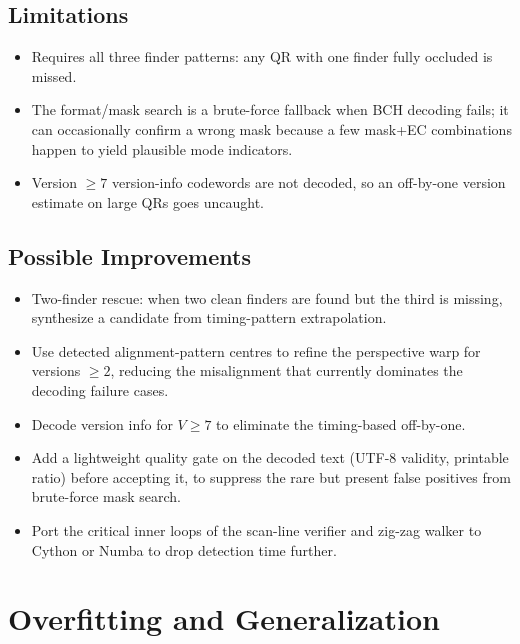 \documentclass[11pt,a4paper]{article}
\begin{document}
\subsection{Limitations}

\begin{itemize}[leftmargin=1.4em, itemsep=0.2em]
  \item Requires all three finder patterns: any QR with one finder
        fully occluded is missed.
  \item The format/mask search is a brute-force fallback when BCH
        decoding fails; it can occasionally confirm a wrong mask
        because a few mask+EC combinations happen to yield plausible
        mode indicators.
  \item Version $\ge 7$ version-info codewords are not decoded, so an
        off-by-one version estimate on large QRs goes uncaught.
\end{itemize}

\subsection{Possible Improvements}

\begin{itemize}[leftmargin=1.4em, itemsep=0.2em]
  \item Two-finder rescue: when two clean finders are found but the
        third is missing, synthesize a candidate from timing-pattern
        extrapolation.
  \item Use detected alignment-pattern centres to refine the
        perspective warp for versions $\ge 2$, reducing the
        misalignment that currently dominates the decoding failure
        cases.
  \item Decode version info for $V \ge 7$ to eliminate the
        timing-based off-by-one.
  \item Add a lightweight quality gate on the decoded text (UTF-8
        validity, printable ratio) before accepting it, to suppress
        the rare but present false positives from brute-force mask
        search.
  \item Port the critical inner loops of the scan-line verifier and
        zig-zag walker to Cython or Numba to drop detection time
        further.
\end{itemize}

\section{Overfitting and Generalization}
\end{document}
